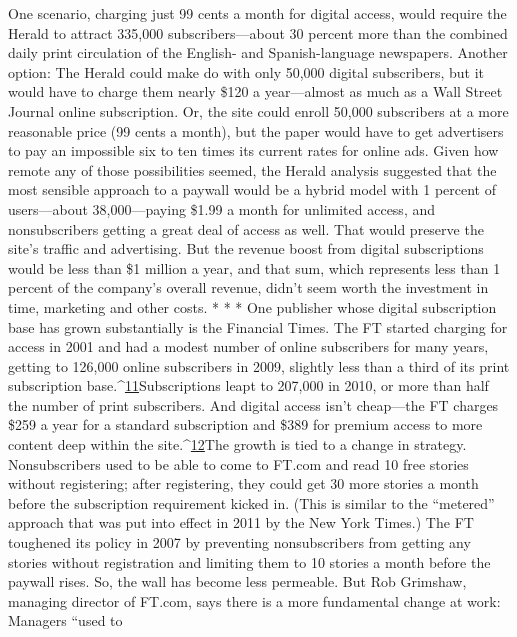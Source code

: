 One scenario, charging just 99 cents a month for digital access, would require
the Herald to attract 335,000 subscribers—about 30 percent more than the combined
daily print circulation of the English- and Spanish-language newspapers.
Another option: The Herald could make do with only 50,000 digital subscribers,
but it would have to charge them nearly \$120 a year—almost as much as a Wall
Street Journal online subscription. Or, the site could enroll 50,000 subscribers
at a more reasonable price (99 cents a month), but the paper would have to get
advertisers to pay an impossible six to ten times its current rates for online ads.
Given how remote any of those possibilities seemed, the Herald analysis suggested
that the most sensible approach to a paywall would be a hybrid model
with 1 percent of users—about 38,000—paying \$1.99 a month for unlimited access,
and nonsubscribers getting a great deal of access as well. That would preserve
the site's traffic and advertising. But the revenue boost from digital subscriptions
would be less than \$1 million a year, and that sum, which represents less than 1
percent of the company's overall revenue, didn't seem worth the investment in
time, marketing and other costs.
* * *
One publisher whose digital subscription base has grown substantially is the
Financial Times.
The FT started charging for access in 2001 and had a modest number of online
subscribers for many years, getting to 126,000 online subscribers in 2009, slightly
less than a third of its print subscription base.^{\href{#endnotes-chapter-5}{11}}Subscriptions leapt to 207,000
in 2010, or more than half the number of print subscribers. And digital access
isn't cheap—the FT charges \$259 a year for a standard subscription and \$389 for
premium access to more content deep within the site.^{\href{#endnotes-chapter-5}{12}}The growth is tied to a change in strategy. Nonsubscribers used to be able to
come to FT.com and read 10 free stories without registering; after registering,
they could get 30 more stories a month before the subscription requirement
kicked in. (This is similar to the ``metered'' approach that was put into effect in
2011 by the New York Times.) The FT toughened its policy in 2007 by preventing
nonsubscribers from getting any stories without registration and limiting
them to 10 stories a month before the paywall rises.
So, the wall has become less permeable. But Rob Grimshaw, managing director
of FT.com, says there is a more fundamental change at work: Managers ``used to
